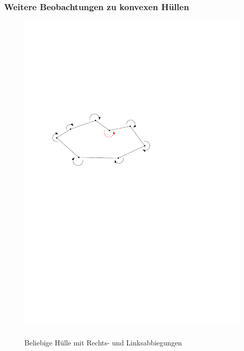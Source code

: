 \begin{frame}
	\frametitle{Weitere Beobachtungen zu konvexen Hüllen}
\begin{figure}[htbp]
  \centering
  \begin{minipage}[b]{.48\linewidth}
    \includegraphics[width=\linewidth]{bilder/nichtKonvexRechts}
    \\
    \\
    \small{Beliebige Hülle mit Rechts- und Linksabbiegungen}
  \end{minipage}
  \hfill
  \pause
  \begin{minipage}[b]{.48\linewidth}

\end{minipage}
\end{figure}
\end{frame}
